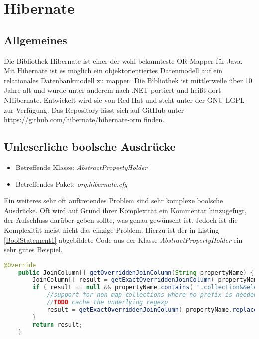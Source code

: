 
\section{Hibernate}
\subsection{Allgemeines}
Die Bibliothek Hibernate ist einer der wohl bekannteste OR-Mapper für Java. Mit Hibernate ist es möglich ein objektorientiertes Datenmodell  auf ein relationales Datenbankmodell zu mappen. Die Bibliothek ist mittlerweile über 10 Jahre alt und wurde unter anderem nach .NET portiert und heißt dort NHibernate. Entwickelt wird sie von Red Hat und steht unter der GNU LGPL zur Verfügung. Das Repository lässt sich auf GitHub unter https://github.com/hibernate/hibernate-orm finden.

 
\subsection{Unleserliche boolsche Ausdrücke}
\label{cha:BadBoolStatements}
\begin{itemize}
	\item Betreffende Klasse: \textit{AbstractPropertyHolder}
	\item Betreffendes Paket: \textit{org.hibernate.cfg}
\end{itemize}

\SuperPar Ein weiteres sehr oft auftretendes Problem sind sehr komplexe boolsche Ausdrücke. Oft wird auf Grund ihrer Komplexität ein Kommentar hinzugefügt, der Aufschluss darüber geben sollte, was genau gewünscht ist. Jedoch ist die Komplexität meist nicht das einzige Problem. Hierzu ist der in Listing \ref{BoolStatement1} abgebildete Code aus der Klasse \textit{AbstractPropertyHolder} ein sehr gutes Beispiel.

\begin{lstlisting}[language=Java, caption=Komplexe boolsche Ausdrücke 1 Zeile 255 - 264, label=lst:BoolStatement1]
	@Override
	public JoinColumn[] getOverriddenJoinColumn(String propertyName) {
		JoinColumn[] result = getExactOverriddenJoinColumn( propertyName );
		if ( result == null && propertyName.contains( ".collection&&element." ) ) {
			//support for non map collections where no prefix is needed
			//TODO cache the underlying regexp
			result = getExactOverriddenJoinColumn( propertyName.replace( ".collection&&element.", "."  ) );
		}
		return result;
	}
\end{lstlisting}

